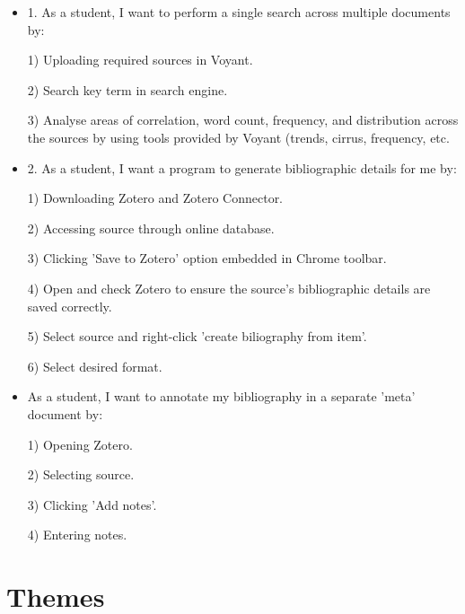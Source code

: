 \documentclass[a4paper,12pt]{article}
\begin{document}
\begin{itemize} 

\item{1. As a student, I want to perform a single search across multiple documents by: 


1) Uploading required sources in Voyant.


2) Search key term in search engine.


3) Analyse areas of correlation, word count, frequency, and distribution across the sources by using tools provided by Voyant (trends, cirrus, frequency, etc. }


\item {2. As a student, I want a program to generate bibliographic details for me by:


1) Downloading Zotero and Zotero Connector.


2) Accessing source through online database.


3) Clicking 'Save to Zotero' option embedded in Chrome toolbar.


4) Open and check Zotero to ensure the source's bibliographic details are saved correctly.

5) Select source and right-click 'create biliography from item'.

6) Select desired format.}

\item{As a student, I want to annotate my bibliography in a separate 'meta' document by:

1) Opening Zotero. 

2) Selecting source.

3) Clicking 'Add notes'.

4) Entering notes.}

\end{itemize}

\section{Themes}
\end{document}
